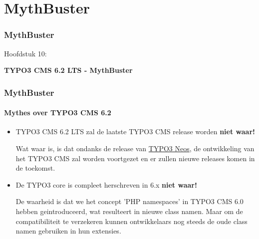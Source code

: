%

\section{MythBuster}
\begin{frame}[fragile]
	\frametitle{MythBuster}

	\begin{center}\huge{Hoofdstuk 10:}\end{center}
	\begin{center}\huge{\color{typo3darkgrey}\textbf{TYPO3 CMS 6.2 LTS - MythBuster}}\end{center}

\end{frame}


\begin{frame}[fragile]
	\frametitle{MythBuster}
	\framesubtitle{Mythes over TYPO3 CMS 6.2}

	\begin{itemize}
		\item TYPO3 CMS 6.2 LTS zal de laatste TYPO3 CMS release worden\newline
			\tabto{8.4cm}\color{red}\textbf{\textrightarrow niet waar!}\color{black}

			\smaller
				Wat waar is, is dat ondanks de release van \href{http://neos.typo3.org}{TYPO3 Neos}, de ontwikkeling van het TYPO3 CMS zal worden voortgezet en er zullen nieuwe releases komen in de toekomst.
			\normalsize

		\item De TYPO3 core is compleet herschreven in 6.x\newline
			\tabto{8.4cm}\color{red}\textbf{\textrightarrow niet waar!}\color{black}

			\smaller
				De waarheid is dat we het concept 'PHP namespaces' in TYPO3 CMS 6.0 hebben geintroduceerd, wat resulteert in nieuwe class namen. Maar om de compatibiliteit te verzekeren kunnen ontwikkelaars nog steeds de oude class namen gebruiken in hun extensies. 
			\normalsize

	\end{itemize}

\end{frame}

